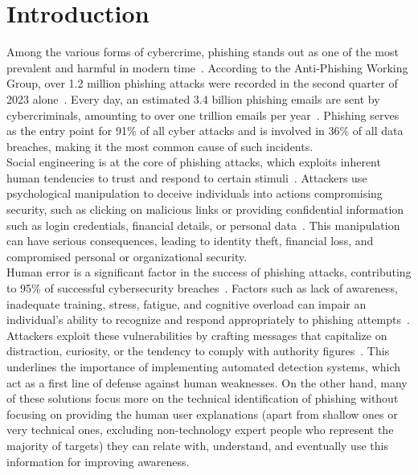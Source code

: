 \section{Introduction}
\label{sec:intro}
Among the various forms of cybercrime, phishing stands out as one of the most prevalent and harmful in modern time~\cite{b5}. According to the Anti-Phishing Working Group, over 1.2 million phishing attacks were recorded in the second quarter of 2023 alone~\cite{b6}. Every day, an estimated 3.4 billion phishing emails are sent by cybercriminals, amounting to over one trillion emails per year~\cite{b7}. Phishing serves as the entry point for 91\% of all cyber attacks and is involved in 36\% of all data breaches, making it the most common cause of such incidents. \\
Social engineering is at the core of phishing attacks, which exploits inherent human tendencies to trust and respond to certain stimuli~\cite{b1, b3, b19}. Attackers use psychological manipulation to deceive individuals into actions compromising security, such as clicking on malicious links or providing confidential information such as login credentials, financial details, or personal data~\cite{b2, b21}. This manipulation can have serious consequences, leading to identity theft, financial loss, and compromised personal or organizational security. \\
Human error is a significant factor in the success of phishing attacks, contributing to 95\% of successful cybersecurity breaches~\cite{b8}. Factors such as lack of awareness, inadequate training, stress, fatigue, and cognitive overload can impair an individual's ability to recognize and respond appropriately to phishing attempts~\cite{b9, b10, b17}. Attackers exploit these vulnerabilities by crafting messages that capitalize on distraction, curiosity, or the tendency to comply with authority figures~\cite{b4, b11, b20, b37}. This underlines the importance of implementing automated detection systems, which act as a first line of defense against human weaknesses. On the other hand, many of these solutions focus more on the technical identification of phishing without focusing on providing the human user explanations (apart from shallow ones or very technical ones, excluding non-technology expert people who represent the majority of targets) they can relate with, understand, and eventually use this information for improving awareness.\\
